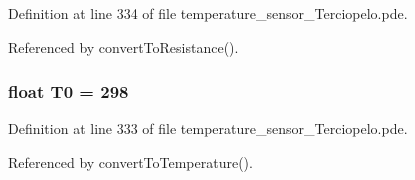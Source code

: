 Definition at line 334 of file temperature\_\-sensor\_\-Terciopelo.pde.

Referenced by convertToResistance().\hypertarget{temperature__sensor___terciopelo_8pde_4211ba1269f650e21964d32238a460b2}{
\subsubsection[{T0}]{\setlength{\rightskip}{0pt plus 5cm}float {\bf T0} = 298}}
\label{temperature__sensor___terciopelo_8pde_4211ba1269f650e21964d32238a460b2}




Definition at line 333 of file temperature\_\-sensor\_\-Terciopelo.pde.

Referenced by convertToTemperature().